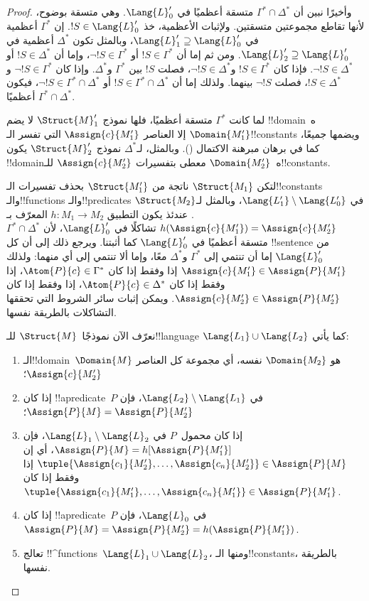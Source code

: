 \documentclass[../../../include/open-logic-section]{subfiles}
\begin{document}
\begin{proof}
وأخيرًا نبين أن $\Gamma^* \cap \Delta^*$ متسقة أعظميًا في
$\Lang{L}'_0$. وهي متسقة بوضوح، لأنها تقاطع مجموعتين متسقتين. ولإثبات
الأعظمية، خذ $!S \in \Lang{L}'_0$. إن $\Gamma^*$ أعظمية في
$\Lang{L}'_1 \supseteq \Lang{L}'_0$، وبالمثل تكون $\Delta^*$ أعظمية
في $\Lang{L}'_2 \supseteq \Lang{L}'_0$. ومن ثم إما أن
$!S \in \Gamma^*$ أو $\lnot !S \in \Gamma^*$، وإما أن
$!S \in \Delta^*$ أو $\lnot !S \in \Delta^*$. فإذا كان
$!S \in \Gamma^*$ و$\lnot !S \in \Delta^*$، فصلت $!S$ بين
$\Gamma^*$ و$\Delta^*$. وإذا كان $\lnot !S \in \Gamma^*$ و
$!S \in \Delta^*$، فصلت $\lnot !S$ بينهما. ولذلك إما أن
$!S \in \Gamma^* \cap \Delta^*$ أو
$\lnot !S \in \Gamma^* \cap \Delta^*$، فيكون
$\Gamma^* \cap \Delta^*$ أعظميًا.

لما كانت $\Gamma^*$ متسقة أعظميًا، فلها نموذج $\Struct{M}'_1$ لا يضم
!!{domain}ه~$\Domain{M'_1}$ إلا العناصر $\Assign{c}{M'_1}$ التي تفسر
الـ!!{constant}s ويضمها جميعًا، كما في برهان مبرهنة الاكتمال
(). وبالمثل، لـ$\Delta^*$ نموذج
$\Struct{M}'_2$ يكون !!{domain}ه~$\Domain{M'_2}$ معطى بتفسيرات
$\Assign{c}{M'_2}$ للـ!!{constant}s.

لتكن $\Struct{M_1}$ ناتجة من $\Struct{M'_1}$ بحذف تفسيرات
الـ!!{constant}s والـ!!{function}s والـ!!{predicate}s في
$\Lang{L'_1} \setminus \Lang{L'_0}$، وبالمثل لـ$\Struct{M_2}$.
عندئذ يكون التطبيق $h \colon M_1 \to M_2$ المعرّف بـ
$h(\Assign{c}{M'_1})=\Assign{c}{M'_2}$ تشاكلًا في $\Lang{L}'_0$، لأن
$\Gamma^* \cap \Delta^*$ متسقة أعظميًا في $\Lang{L}'_0$ كما أثبتنا.
ويرجع ذلك إلى أن كل !!{sentence} من $\Lang{L}'_0$ إما أن تنتمي إلى
$\Gamma^*$ و$\Delta^*$ معًا، وإما ألا تنتمي إلى أي منهما: ولذلك
$\Assign{c}{M'_1} \in \Assign{P}{M'_1}$ إذا وفقط إذا كان
$\Atom{P}{c} \in \Gamma^*$، إذا وفقط إذا كان
$\Atom{P}{c} \in \Delta^*$، إذا وفقط إذا كان
$\Assign{c}{M'_2} \in \Assign{P}{M'_2}$. ويمكن إثبات سائر الشروط التي
تحققها التشاكلات بالطريقة نفسها.

نعرّف الآن نموذجًا~$\Struct{M}$ للـ!!{language}
$\Lang{L_1} \cup \Lang{L_2}$ كما يأتي:
\begin{enumerate}
\item الـ!!{domain}~$\Domain{M}$ هو $\Domain{M_2}$ نفسه، أي مجموعة كل
  العناصر $\Assign{c}{M'_2}$؛
\item إذا كان !!a{predicate}~$P$ في
  $\Lang{L_2} \setminus \Lang{L_1}$، فإن
  $\Assign{P}{M}=\Assign{P}{M'_2}$؛
\item إذا كان محمول~$P$ في $\Lang{L}_1\setminus \Lang{L}_2$، فإن
  $\Assign{P}{M}=h[\Assign{P}{M'_1}]$، أي إن
  $\tuple{\Assign{c_1}{M'_2},\dots,\Assign{c_n}{M'_2}} \in
  \Assign{P}{M}$ إذا وفقط إذا كان
  $\tuple{\Assign{c_1}{M'_1},\dots,\Assign{c_n}{M'_1}} \in
  \Assign{P}{M'_1}$.
\item إذا كان !!a{predicate}~$P$ في $\Lang{L}_0$، فإن
  $\Assign{P}{M}=\Assign{P}{M'_2}=h(\Assign{P}{M'_1})$.
\item تعالج !!^{function}s~$\Lang{L}_1 \cup \Lang{L}_2$، ومنها
  الـ!!{constant}s، بالطريقة نفسها.
\end{enumerate}


\end{proof}
\end{document}
